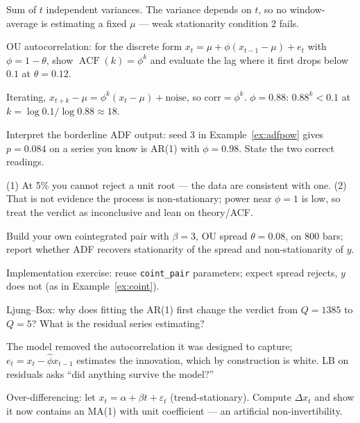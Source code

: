 \begin{solution}
Sum of $t$ independent variances. The variance depends on $t$, so no
window-average is estimating a fixed $\mu$ --- weak stationarity
condition 2 fails.
\end{solution}
\begin{exercise}[medium]
OU autocorrelation: for the discrete form
$x_t=\mu+\phi(x_{t-1}-\mu)+e_t$ with $\phi=1-\theta$, show
$\operatorname{ACF}(k)=\phi^k$ and evaluate the lag where it first
drops below $0.1$ at $\theta=0.12$.
\end{exercise}
\begin{solution}
Iterating, $x_{t+k}-\mu=\phi^k(x_t-\mu)+\text{noise}$, so
corr$=\phi^k$. $\phi=0.88$: $0.88^k<0.1$ at $k=\log0.1/\log0.88
\approx18$.
\end{solution}
\begin{exercise}[medium]
Interpret the borderline ADF output: seed 3 in
Example~\ref{ex:adfpow} gives $p=0.084$ on a series you know is
AR(1) with $\phi=0.98$. State the two correct readings.
\end{exercise}
\begin{solution}
(1) At 5\% you cannot reject a unit root --- the data are consistent
with one. (2) That is not evidence the process is non-stationary;
power near $\phi=1$ is low, so treat the verdict as inconclusive and
lean on theory/ACF.
\end{solution}
\begin{exercise}[medium]
Build your own cointegrated pair with $\beta=3$, OU spread
$\theta=0.08$, on 800 bars; report whether ADF recovers stationarity
of the spread and non-stationarity of $y$.
\end{exercise}
\begin{solution}
Implementation exercise: reuse \texttt{coint\_pair} parameters;
expect spread rejects, $y$ does not (as in
Example~\ref{ex:coint}).
\end{solution}
\begin{exercise}[medium]
Ljung--Box: why does fitting the AR(1) first change the verdict from
$Q=1385$ to $Q=5$? What is the residual series estimating?
\end{exercise}
\begin{solution}
The model removed the autocorrelation it was designed to capture;
$e_t=x_t-\hat\phi x_{t-1}$ estimates the innovation, which by
construction is white. LB on residuals asks ``did anything survive
the model?''
\end{solution}
\begin{exercise}[hard]
Over-differencing: let $x_t=\alpha+\beta t+\varepsilon_t$
(trend-stationary). Compute $\Delta x_t$ and show it now contains an
MA(1) with unit coefficient --- an artificial non-invertibility.
\end{exercise}

